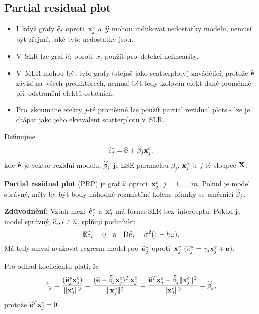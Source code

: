 \subsection{Partial residual plot}
\begin{itemize}
\item I~když grafy $\widehat{e}_i$ oproti~$\mathbf{x}_j^c$ a~$\widehat{y}$ mohou indukovat nedostatky modelu, nemusí být zřejmé, jaké tyto nedostatky jsou.
\item V~SLR lze graf $\widehat{e}_i$ oproti~$x_i$ použít pro~detekci nelinearity.
\item V~MLR mohou být tyto grafy (stejně jako scatterploty) zavádějící, protože $\widehat{\mathbf{e}}$ závisí na~všech prediktorech, nemusí být tedy izolován efekt dané proměnné při~odstranění efektů ostatních.
\item Pro~zkoumané efekty $j$-té proměnné lze použít partial rezidual plots - lze je chápat jako jeho ekvivalent scatterplotu v~SLR.
\end{itemize}

\begin{define}
Definujme
$$
   \widehat{e}_j^* = \widehat{\mathbf{e}} + \widehat{\beta}_j \mathbf{x}_j^c,
$$
 kde $\widehat{\mathbf{e}}$ je vektor reziduí modelu, $\widehat{\beta}_j$ je LSE parametru $\beta_j$, $\mathbf{x}_j^c$ je $j$-tý sloupec $\mathbf{X}$.
\end{define}

\textbf{Partial residual plot} (PRP) je graf $\widehat{\mathbf{e}}$ oproti~$\mathbf{x}_j^c$, $j = 1,..., m$. Pokud je model správný, měly by být body náhodně rozmístěné kolem~přímky se~směrnicí $\widehat{\beta}_j$.

\textbf{Zdůvodnění:} Vztah mezi~$\widehat{\mathbf{e}}_j^*$ a~$\mathbf{x}_j^c$ má formu SLR bez~interceptu. Pokud je model správný, $\widehat{e}_i, i\in\widehat{n} $, splňují podmínku
$$\mathbb{E} \widehat{e}_i = 0 \quad \text{a} \quad \mathrm{D} \widehat{e}_i = \sigma^2(1 - h_{ii}).$$
Má tedy smysl uvažovat regresní model pro~$\widehat{\mathbf{e}}_j^*$ oproti~$\mathbf{x}_j^c$ ($\widehat{e}_j^* = \gamma_j \mathbf{x}_j^c + \mathbf{e}$).

\newcommand{\hg}{\widehat{\gamma}}

Pro odhad koeficientu platí, že
 $$
\hg_j = \frac{(\heb_j^* \x_j^c)}{\norm{\x_j^c}^2} = \frac{(\heb + \wbeta_j \x_j^c)^T \x_j^c}{\norm{\x_j^c}^2} = \frac{\heb^T \x_j^c + \wbeta_j \norm{\x_j^c}^2}{\norm{\x_j^c}^2} = \wbeta_j,
 $$
protože $\widehat{\mathbf{e}}^T \mathbf{x}_j^c = 0$.


\newcommand{\wb}{\mathbf{w}}
\newcommand{\Xmj}{\X_{(-j)}}
\newcommand{\Xmi}{\X_{(-i)}}

